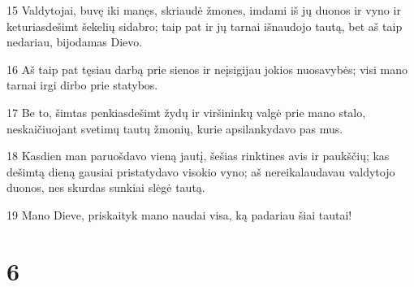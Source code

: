 \par 15 Valdytojai, buvę iki manęs, skriaudė žmones, imdami iš jų duonos ir vyno ir keturiasdešimt šekelių sidabro; taip pat ir jų tarnai išnaudojo tautą, bet aš taip nedariau, bijodamas Dievo. 
\par 16 Aš taip pat tęsiau darbą prie sienos ir neįsigijau jokios nuosavybės; visi mano tarnai irgi dirbo prie statybos. 
\par 17 Be to, šimtas penkiasdešimt žydų ir viršininkų valgė prie mano stalo, neskaičiuojant svetimų tautų žmonių, kurie apsilankydavo pas mus. 
\par 18 Kasdien man paruošdavo vieną jautį, šešias rinktines avis ir paukščių; kas dešimtą dieną gausiai pristatydavo visokio vyno; aš nereikalaudavau valdytojo duonos, nes skurdas sunkiai slėgė tautą. 
\par 19 Mano Dieve, priskaityk mano naudai visa, ką padariau šiai tautai!



\chapter{6}

